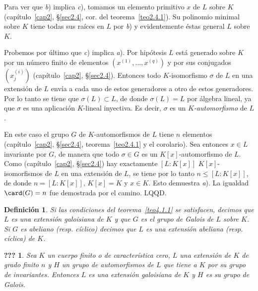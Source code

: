 \documentclass[bibtotoc,leqno,spanish]{amsbook}
\newcommand{\QED}{LQQD.}
\numberwithin{equation}{section}
\theoremstyle{note}
\newtheorem{definition}{Definici\'on}
\theoremstyle{note}
\newcommand{\namedname}{???}
\newtheorem*{namedthm}{\namedname}
\newenvironment{named}[1]%
	{\renewcommand{\namedname}{#1}%
	\begin{namedthm}}%
	{\end{namedthm}}
\theoremstyle{rem}
\numberwithin{theorem}{section}
\numberwithin{proposition}{section}
\numberwithin{definition}{section}
\numberwithin{lemma}{section}
\numberwithin{corollary}{section}
\numberwithin{example}{section}
\numberwithin{footnote}{section}%
\begin{document}
Para ver que \textit{b}) implica {\itshape c}), tomamos un elemento primitivo $x$ de $L$ sobre $K$
(cap\'itulo~\ref{cap2}, \S\ref{sec2.4}, cor. del teorema~\ref{teo2.4.1}). Su polinomio minimal sobre $K$ tiene todas sus ra\'ices en
$L$ por {\itshape b}) y evidentemente \'estas general $L$ sobre $K$.

Probemos por \'ultimo que {\itshape c}) implica {\itshape a}). Por hip\'otesis $L$ est\'a generado sobre $K$
por un n\'umero finito de elementos $(x^{(1)},\dots,x^{(q)})$ y por sus conjugados $(x_{j}^{(i)})$
(cap\'itulo~\ref{cap2}, \S\ref{sec2.4}). Entonces todo $K$-isomorfismo $\sigma$ de $L$ en una extensi\'on de $L$
env\'ia a cada uno de estos generadores a otro de estos generadores. Por lo tanto se tiene que $\sigma(L)\subset L$,
de donde $\sigma(L) =L$ por \'algebra lineal, ya que $\sigma$ es una aplicaci\'on $K$-lineal inyectiva. Es decir,
$\sigma$ es un {\em $K$-automorfismo} de $L$.

En este caso el grupo $G$ de $K$-automorfismos de $L$ tiene $n$ elementos (cap\'itulo~\ref{cap2}, \S\ref{sec2.4}, teorema~\ref{teo2.4.1} y
el corolario). Sea entonces $x\in L$ invariante por $G$, de manera que todo $\sigma\in G$ es un $K[x]$-automorfismo
de $L$. Como (cap\'itulo~\ref{cap2}, \S\ref{sec2.4}) hay exactamente $[L:K[x]]$ $K[x]$-isomorfismos de $L$ en una
extensi\'on de $L$, se tiene por lo tanto $n\leq[L:K[x]]$, de donde $n=[L:K[x]]$, $K[x] = K$ y
$x\in K$. Esto demuestra {\itshape a}). La igualdad $\card(G) = n$ fue demostrada por el camino. \QED

\begin{definition}
Si las condiciones del teorema~\ref{teo4.1.1} se satisfacen, decimos que $L$ es una extensi\'on galoisiana de $K$ y que
$G$ es el grupo de Galois de $L$ sobre $K$. Si $G$ es abeliano (resp. c\'iclico) decimos que $L$ es una
extensi\'on abeliana (resp. c\'iclica) de $K$.
\end{definition}

\begin{named}{Corolario del teorema 1}
Sea $K$ un cuerpo finito o de caracter\'istica cero, $L$ una extensi\'on de $K$ de grado finito $n$ y
$H$ un grupo de automorfismos de $L$ que tiene a $K$ por su grupo de invariantes. Entonces $L$ es una
extensi\'on galoisiana de $K$ y $H$ es su grupo de Galois.
\end{named}
\end{document}
